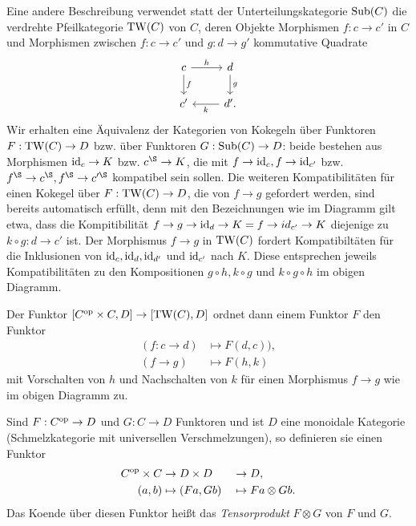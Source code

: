 \begin{bem}
  Eine andere Beschreibung verwendet statt der Unterteilungskategorie
  $\operatorname{Sub}(C)$ die verdrehte Pfeilkategorie $\operatorname{TW}(C)$ von $C$, deren Objekte
  Morphismen $f: c \to c'$ in $C$ und Morphismen zwischen $f: c \to
  c'$ und $g: d \to g'$ kommutative Quadrate
  \[ \begin{tikzcd}
    c \arrow{d}{f} \arrow{r}{h} & d \arrow{d}{g} \\
    c' & \arrow{l}{k} d'.
  \end{tikzcd} \]
  Wir erhalten eine Äquivalenz der Kategorien von Kokegeln über
  Funktoren $F: \operatorname{TW}(C) \to D$ bzw. über Funktoren $G: \operatorname{Sub}(C) \to D$:
  beide bestehen aus Morphismen $\operatorname{id}_c \to K$ bzw. $c^\S \to K$, die
  mit $f \to \operatorname{id}_c, f \to \operatorname{id}_{c'}$ bzw. $f^\S \to c^\S, f^\S \to
  c'^\S$ kompatibel sein sollen. Die weiteren Kompatibilitäten für
  einen Kokegel über $F: \operatorname{TW}(C) \to D$, die von $f \to g$ gefordert
  werden, sind bereits automatisch erfüllt, denn mit den Bezeichnungen
  wie im Diagramm gilt etwa, dass die Kompitibilität $f \to g \to
  \operatorname{id}_d \to K = f \to id_{c'} \to K$ diejenige zu $k \circ g: d \to
  c'$ ist. Der Morphismus $f \to g$ in $\operatorname{TW}(C)$ fordert
  Kompatibiltäten für die Inklusionen von $\operatorname{id}_c, \operatorname{id}_d, \operatorname{id}_{d'}$ und
  $\operatorname{id}_{c'}$ nach $K$. Diese entsprechen jeweils Kompatibilitäten zu
  den Kompositionen $g \circ h, k \circ g$ und $k \circ g \circ h$ im
  obigen Diagramm.

  Der Funktor $[C^\mathrm{op} \times C, D] \to [\operatorname{TW}(C), D]$ ordnet dann einem
  Funktor $F$ den Funktor
  \begin{align*}
    (f: c \to d) &\mapsto F(d, c)), \\
    (f \to g) &\mapsto F(h, k)
  \end{align*}
  mit Vorschalten von $h$ und Nachschalten von $k$ für einen
  Morphismus $f \to g$ wie im obigen Diagramm zu.
\end{bem}

Sind $F: C^\mathrm{op} \to D$ und $G: C \to D$ Funktoren und ist $D$ eine
monoidale Kategorie (Schmelzkategorie mit universellen
Verschmelzungen), so definieren sie einen Funktor
\begin{alignat*}{4}
  C^\mathrm{op} \times C &\to D \times D &&\to D, \\
  (a, b) &\mapsto (Fa, Gb) &&\mapsto Fa \otimes Gb.
\end{alignat*}
Das Koende über diesen Funktor heißt das \emph{Tensorprodukt} $F
\otimes G$ von $F$ und $G$.

